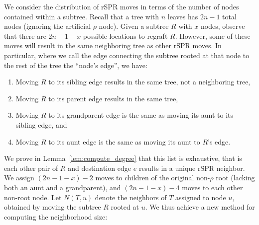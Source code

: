 \documentclass[]{elsarticle}
\begin{document}
We consider the distribution of rSPR moves in terms of the number of nodes contained within a subtree.
Recall that a tree with $n$ leaves has $2n-1$ total nodes (ignoring the artificial $\rho$ node).
Given a subtree $R$ with $x$ nodes, observe that there are $2n-1 - x$ possible locations to regraft $R$.
However, some of these moves will result in the same neighboring tree as other rSPR moves.
In particular, where we call the edge connecting the subtree rooted at that node to the rest of the tree the ``node's edge'', we have:
\begin{enumerate}
\item Moving $R$ to its sibling edge results in the same tree, not a neighboring tree,
\item Moving $R$ to its parent edge results in the same tree,
\item Moving $R$ to its grandparent edge is the same as moving its aunt to its sibling edge, and
\item Moving $R$ to its aunt edge is the same as moving its aunt to $R$'s edge.
\end{enumerate}
We prove in Lemma~\ref{lem:compute_degree} that this list is exhaustive, that is each other pair of $R$ and destination edge $e$ results in a unique rSPR neighbor.
We assign $(2n-1-x)-2$ moves to children of the original non-$\rho$ root (lacking both an aunt and a grandparent), and $(2n-1-x)-4$ moves to each other non-root node.
Let $N(T,u)$ denote the neighbors of $T$ assigned to node $u$, obtained by moving the subtree $R$ rooted at $u$.
We thus achieve a new method for computing the neighborhood size:
\end{document}
